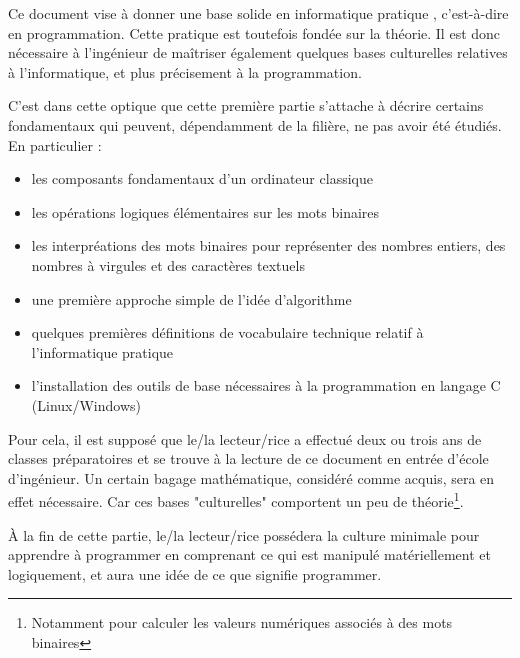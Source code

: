 \documentclass[../../main.tex]{subfiles}
\begin{document}
Ce document vise à donner une base solide en informatique \og pratique \fg{}, c'est-à-dire en programmation.
Cette pratique est toutefois fondée sur la théorie. Il est donc nécessaire à l'ingénieur de maîtriser
également quelques bases culturelles relatives à l'informatique, et plus précisement à la programmation.

C'est dans cette optique que cette première partie s'attache à décrire certains fondamentaux qui
peuvent, dépendamment de la filière, ne pas avoir été étudiés. En particulier :
\begin{itemize}
	\item les composants fondamentaux d'un ordinateur classique
	\item les opérations logiques élémentaires sur les mots binaires
	\item les interpréations des mots binaires pour représenter des nombres entiers, des nombres à virgules et des caractères textuels
	\item une première approche simple de l'idée d'algorithme
	\item quelques premières définitions de vocabulaire technique relatif à l'informatique pratique
	\item l'installation des outils de base nécessaires à la programmation en langage C (Linux/Windows)
\end{itemize}
Pour cela, il est supposé que le/la lecteur/rice a effectué deux ou trois ans de classes préparatoires et
se trouve à la lecture de ce document en entrée d'école d'ingénieur. Un certain bagage mathématique, considéré comme acquis, sera en effet nécessaire. Car ces bases "culturelles" comportent un peu de théorie\footnote{Notamment pour calculer les valeurs numériques associés à des mots binaires}.

À la fin de cette partie, le/la lecteur/rice possédera la culture minimale pour apprendre à programmer en comprenant ce qui est manipulé matériellement et logiquement, et aura une idée de ce que signifie programmer.

\hrulefill
\newpage
\end{document}

